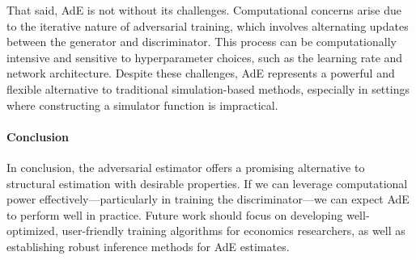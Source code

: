 \documentclass[12pt]{article}
\begin{document}
That said, AdE is not without its challenges. Computational concerns arise due
to the iterative nature of adversarial training, which involves alternating
updates between the generator and discriminator. This process can be
computationally intensive and sensitive to hyperparameter choices, such as the
learning rate and network architecture. Despite these challenges, AdE
represents a powerful and flexible alternative to traditional simulation-based
methods, especially in settings where constructing a simulator function is
impractical.

\paragraph{Conclusion}
In conclusion, the adversarial estimator offers a promising alternative to
structural estimation with desirable properties. If we can leverage
computational power effectively—particularly in training the discriminator—we
can expect AdE to perform well in practice. Future work should focus on
developing well-optimized, user-friendly training algorithms for economics
researchers, as well as establishing robust inference methods for AdE
estimates.

\pagebreak
\newpage

\end{document}
